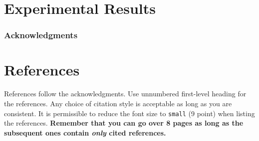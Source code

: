 \documentclass{article}
\begin{document}
\section{Experimental Results}
\label{sec:experimental_results}


\subsubsection*{Acknowledgments}


\section*{References}

References follow the acknowledgments. Use unnumbered first-level
heading for the references. Any choice of citation style is acceptable
as long as you are consistent. It is permissible to reduce the font
size to \verb+small+ (9 point) when listing the references. {\bf
  Remember that you can go over 8 pages as long as the subsequent ones contain
  \emph{only} cited references.}
\medskip

\small

\clearpage
\newpage


\end{document}
